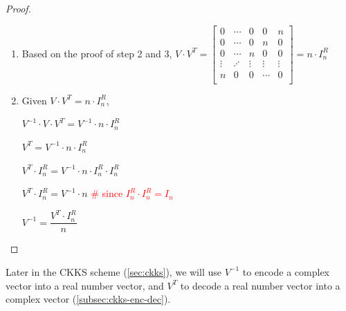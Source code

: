 \begin{proof}
\begin{enumerate}
$ $

Therefore,

$\sum\limits_{k=0}^{n-1} \omega^{2k} = \sum\limits_{k=0}^{n-1} \omega^{4k} = \sum\limits_{k=0}^{n-1} \omega^{6k} = \cdots = \sum\limits_{k=0}^{n-1} \omega^{2(n-1)k} = \sum\limits_{k=0}^{n-1} \omega^{2(n+1)k} = \cdots = \sum\limits_{k=0}^{n-1} \omega^{2(2n-1)k} = 0$

$ $

\item Based on the proof of step 2 and 3, $V \cdot V^T = 
\begin{bmatrix}
0 & \cdots & 0 & 0 & n\\
0 & \cdots & 0 & n & 0\\
0 & \cdots & n & 0 & 0\\
\vdots & \iddots & \vdots & \vdots & \vdots \\
n & 0 & 0 & \cdots & 0\\
\end{bmatrix} = n \cdot I_n^R$

\item Given $V \cdot V^T = n \cdot I_n^R$, 

$V^{-1} \cdot V \cdot V^T = V^{-1} \cdot n \cdot I_n^R$

$V^T = V^{-1} \cdot n \cdot I_n^R$

$V^T \cdot I_n^R = V^{-1} \cdot n \cdot I_n^R  \cdot I_n^R$

$V^T \cdot I_n^R = V^{-1} \cdot n$ \textcolor{red}{\text{ } \# since $I_n^R  \cdot I_n^R = I_n$}

$V^{-1} = \dfrac{V^T \cdot I_n^R}{n}$

\end{enumerate}
\end{proof}

Later in the CKKS scheme (\autoref{sec:ckks}), we will use $V^{-1}$ to encode a complex vector into a real number vector, and $V^T$ to decode a real number vector into a complex vector (\autoref{subsec:ckks-enc-dec}).

$ $




